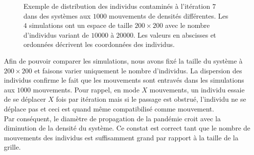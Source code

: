 \begin{figure}[h]
	\caption[Positions des individus : 1000 mouvements, densité variable]{Exemple de distribution des individus contaminés à l'itération $7$ dans des systèmes aux $1000$ mouvements de densités différentes. Les $4$ simulations ont un espace de taille $200 \times 200$ avec le nombre d'individus variant de $10000$ à $20000$. Les valeurs en abscisses et ordonnées décrivent les coordonnées des individus.}
\end{figure}

Afin de pouvoir comparer les simulations, nous avons fixé la taille du système à $200 \times 200$ et faisons varier uniquement le nombre d'individus. La dispersion des individus confirme le fait que les mouvements sont entravés dans les simulations aux $1000$ mouvements. Pour rappel, en mode $X$ mouvements, un individu essaie de se déplacer $X$ fois par itération mais si le passage est obstrué, l'individu ne se déplace pas et ceci est quand même compatibilisé comme mouvement.\\

Par conséquent, le diamètre de propagation de la pandémie croit avec la diminution de la densité du système. Ce constat est correct tant que le nombre de mouvements des individus est suffisamment grand par rapport à la taille de la grille.